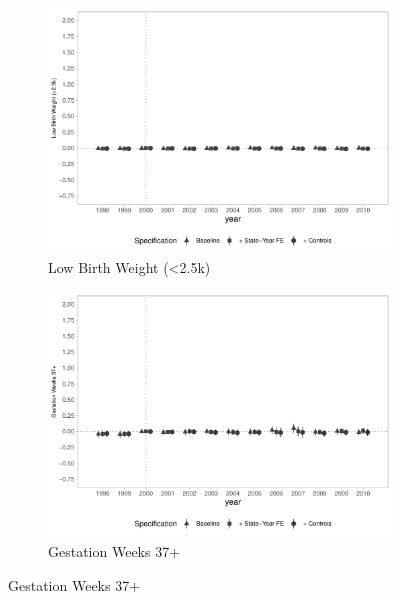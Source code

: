 \begin{figure}[h]
\begin{center}
    \begin{subfigure}{0.48\textwidth}
        \centering
        \caption{\scriptsize Low Birth Weight (<2.5k)}\label{fig:birth_c}
        \includegraphics[width=\textwidth]{plots/birth/birth_low_weight_2500g_dist_ec29_baseline_dist_ec29_baseline_full.pdf}
    \end{subfigure}
    \begin{subfigure}{0.48\textwidth}
        \centering
        \caption{\scriptsize Gestation Weeks 37+ }\label{fig:birth_d}
        \includegraphics[width=\textwidth]{plots/birth/birth_gest_37plus_dist_ec29_baseline_dist_ec29_baseline_full.pdf}
    \end{subfigure}
    
    \end{center}
    
\end{figure}



